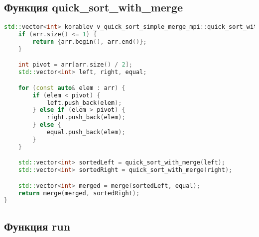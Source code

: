 \documentclass[12pt]{article}
\begin{document}
\subsection*{Функция quick\_sort\_with\_merge}

\begin{lstlisting}[language=C++]
std::vector<int> korablev_v_quick_sort_simple_merge_mpi::quick_sort_with_merge(const std::span<int>& arr) {
    if (arr.size() <= 1) {
        return {arr.begin(), arr.end()};
    }

    int pivot = arr[arr.size() / 2];
    std::vector<int> left, right, equal;

    for (const auto& elem : arr) {
        if (elem < pivot) {
            left.push_back(elem);
        } else if (elem > pivot) {
            right.push_back(elem);
        } else {
            equal.push_back(elem);
        }
    }

    std::vector<int> sortedLeft = quick_sort_with_merge(left);
    std::vector<int> sortedRight = quick_sort_with_merge(right);

    std::vector<int> merged = merge(sortedLeft, equal);
    return merge(merged, sortedRight);
}
\end{lstlisting}

\subsection*{Функция run}
\end{document}
